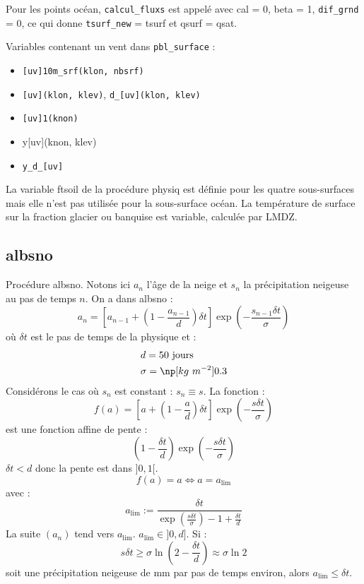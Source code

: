 \documentclass[a4paper,english,french]{article}
\begin{document}
Pour les points océan, \verb+calcul_fluxs+ est appelé avec cal = 0, beta = 1,
\verb+dif_grnd+ = 0, ce qui donne \verb+tsurf_new+ = tsurf et qsurf =
qsat.

Variables contenant un vent dans \verb+pbl_surface+ :
\begin{itemize}
\item \verb+[uv]10m_srf(klon, nbsrf)+
\item \verb+[uv](klon, klev)+, \verb+d_[uv](klon, klev)+
\item \verb+[uv]1(knon)+
\item y[uv](knon, klev)
\item \verb+y_d_[uv]+
\end{itemize}

La variable ftsoil de la procédure physiq est définie pour les quatre
sous-surfaces mais elle n'est pas utilisée pour la sous-surface
océan. La température de surface sur la fraction glacier ou banquise
est variable, calculée par LMDZ.

\subsection{albsno}

Procédure albsno. Notons ici $a_n$ l'âge de la neige et $s_n$ la
précipitation neigeuse au pas de temps $n$. On a dans albsno :
\begin{equation*}
  a_n
  =
  \left[a_{n - 1} + \left(1 - \frac{a_{n - 1}}{d} \right) \delta t \right]
  \exp \left(- \frac{s_{n - 1} \delta t}{\sigma} \right)
\end{equation*}
où $\delta t$ est le pas de temps de la physique et :
\begin{align*}
  & d = 50\ \mathrm{jours} \\
  & \sigma = \np[kg\ m^{-2}]{0.3}
\end{align*}
Considérons le cas où $s_n$ est constant : $s_n \equiv s$. La fonction :
\begin{equation*}
  f(a)
  =
  \left[a + \left(1 - \frac{a}{d} \right) \delta t \right]
  \exp \left(- \frac{s \delta t}{\sigma} \right)
\end{equation*}
est une fonction affine de pente :
\begin{equation*}
  \left(1 - \frac{\delta t}{d} \right)
  \exp \left(- \frac{s \delta t}{\sigma} \right)
\end{equation*}
$\delta t < d$ donc la pente est dans $]0, 1[$.
\begin{equation*}
  f(a) = a \Leftrightarrow a = a_\mathrm{lim}
\end{equation*}
avec :
\begin{equation*}
  a_\mathrm{lim}
  :=
  \frac
  {\delta t}
  {\exp \left(\frac{s \delta t}{\sigma} \right) - 1 + \frac{\delta t}{d}}
\end{equation*}
La suite $(a_n)$ tend vers $a_\mathrm{lim}$. $a_\mathrm{lim} \in ]0,
d]$. Si :
\begin{equation*}
  s \delta t \ge  \sigma \ln \left(2 - \frac{\delta t}{d} \right)
  \approx \sigma \ln 2
\end{equation*}
soit une précipitation neigeuse de  mm par pas de temps
environ, alors $a_\mathrm{lim} \le \delta t$.
\end{document}
